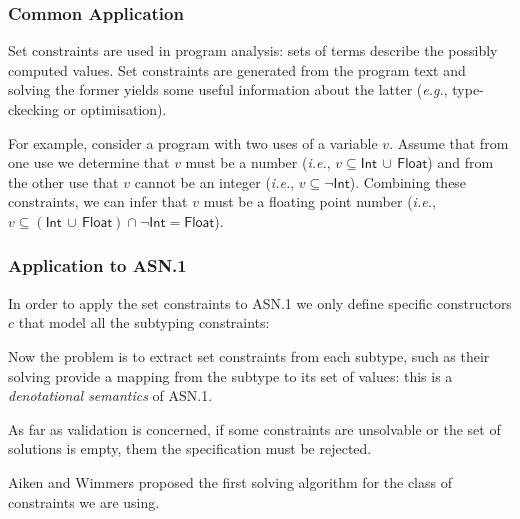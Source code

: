 \documentclass[compress,dvips,xcolor={dvipsnames},t]{beamer}
\newcommand\ASN{\textsf{ASN.1}\xspace}
\begin{document}
\begin{frame}
\frametitle{Common Application}

Set constraints are used in program analysis: sets of terms describe
the possibly computed values. Set constraints are generated from the
program text and solving the former yields some useful information
about the latter (\emph{e.g.}, type-ckecking or optimisation).

\medskip

For example, consider a program with two uses of a variable
$v$. Assume that from one use we determine that $v$ must be a number
(\emph{i.e.}, $v \subseteq \textsf{Int} \, \cup \, \textsf{Float}$)
and from the other use that $v$ cannot be an integer (\emph{i.e.}, $v
\subseteq \neg\textsf{Int}$). Combining these constraints, we can
infer that $v$ must be a floating point number (\emph{i.e.}, $v
\subseteq (\textsf{Int} \, \cup \, \textsf{Float}) \cap
\neg\textsf{Int} = \textsf{Float}$).

\end{frame}

\begin{frame}
\frametitle{Application to \ASN}

In order to apply the set constraints to \ASN we only define specific
constructors $c$ that model all the subtyping constraints:

\medskip

Now the problem is to extract set constraints from each subtype, such
as their solving provide a mapping from the subtype to its set of
values: this is a \emph{denotational semantics} of \ASN.

\medskip

As far as validation is concerned, if some constraints are unsolvable
or the set of solutions is empty, them the specification must be
rejected.

\medskip

Aiken and Wimmers proposed the first solving algorithm for the class
of constraints we are using.

\end{frame}
\end{document}
